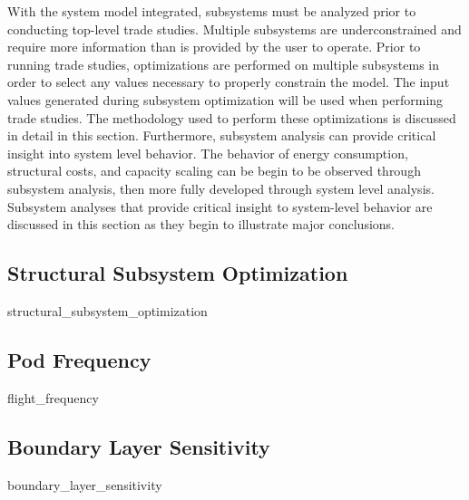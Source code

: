 With the system model integrated, subsystems must be analyzed prior to conducting top-level trade studies.
Multiple subsystems are underconstrained and require more information than is provided by the user to operate.
Prior to running trade studies, optimizations are performed on multiple subsystems
in order to select any values necessary to properly constrain the model.
The input values generated during subsystem optimization will be used when performing trade studies.
The methodology used to perform these optimizations is discussed in detail in this section.
Furthermore, subsystem analysis can provide critical insight into system level behavior.
The behavior of energy consumption, structural costs, and capacity scaling
can be begin to be observed through subsystem analysis,
then more fully developed through system level analysis.
Subsystem analyses that provide critical insight to system-level behavior are
discussed in this section as they begin to illustrate major conclusions.
\subsection{Structural Subsystem Optimization}
	{structural_subsystem_optimization}
\subsection{Pod Frequency}
	{flight_frequency}
\subsection{Boundary Layer Sensitivity}
	{boundary_layer_sensitivity}

